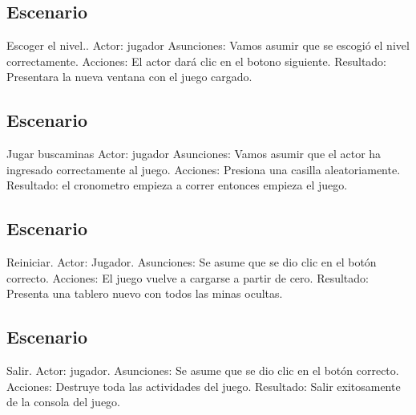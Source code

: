 \documentclass[11pt]{article} %
\begin{document}
\subsection{Escenario}
 
Escoger el nivel..\newline\newline
Actor: jugador
Asunciones: Vamos asumir que se escogió el nivel correctamente.\newline
Acciones: El actor dará clic en el botono siguiente.\newline
Resultado: Presentara la nueva ventana con el juego cargado.\newline

\subsection{Escenario}
Jugar buscaminas\newline \newline
Actor: jugador\newline
Asunciones: Vamos asumir que el actor ha ingresado correctamente al juego.\newline
Acciones: Presiona una casilla aleatoriamente.\newline
Resultado: el cronometro empieza a correr entonces empieza el juego.\newline

\subsection{Escenario}
Reiniciar.\newline \newline
Actor: Jugador. \newline
Asunciones: Se asume que se dio clic en el botón correcto.\newline
Acciones: El  juego vuelve a cargarse a partir de cero.\newline
Resultado: Presenta una tablero nuevo con todos las minas ocultas.\newline

\subsection{Escenario}
Salir.\newline \newline
Actor: jugador.\newline
Asunciones: Se asume que se dio clic en el botón  correcto.\newline
Acciones: Destruye toda las actividades del juego.\newline
Resultado: Salir exitosamente  de la consola del juego.\newline
\newpage
\end{document}
